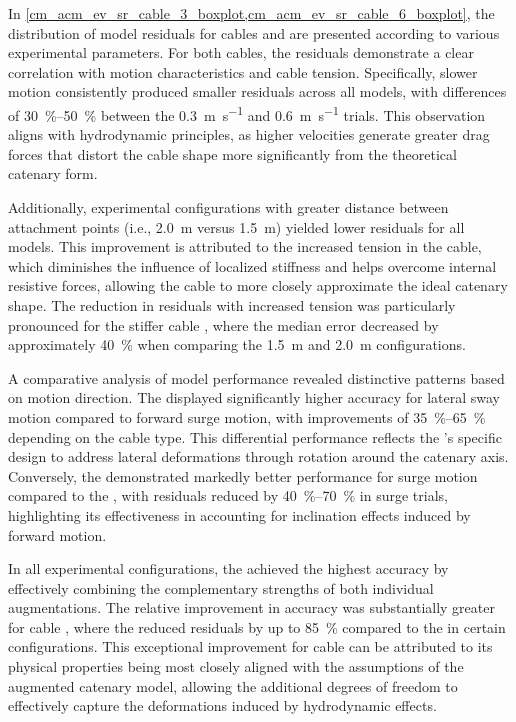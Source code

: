 In \cref{cm_acm_ev_sr_cable_3_boxplot,cm_acm_ev_sr_cable_6_boxplot}, the distribution of model
residuals for cables  and  are presented
according to various experimental parameters. For both cables, the residuals demonstrate a clear
correlation with motion characteristics and cable tension. Specifically, slower motion consistently
produced smaller residuals across all models, with differences of \qtyrange{30}{50}{\percent}
between the \qty{0.3}{\meter\per\second} and \qty{0.6}{\meter\per\second} trials. This observation
aligns with hydrodynamic principles, as higher velocities generate greater drag forces that distort
the cable shape more significantly from the theoretical catenary form.

Additionally, experimental configurations with greater distance between attachment points (i.e.,
\qty{2.0}{\meter} versus \qty{1.5}{\meter}) yielded lower residuals for all models. This
improvement is attributed to the increased tension in the cable, which diminishes the influence of
localized stiffness and helps overcome internal resistive forces, allowing the cable to more
closely approximate the ideal catenary shape. The reduction in residuals with increased tension was
particularly pronounced for the stiffer cable , where the median error
decreased by approximately \qty{40}{\percent} when comparing the \qty{1.5}{\meter} and
\qty{2.0}{\meter} configurations.

A comparative analysis of model performance revealed distinctive patterns based on motion
direction. The \gammamodel{} displayed significantly higher accuracy for lateral sway motion
compared to forward surge motion, with improvements of \qtyrange{35}{65}{\percent} depending on the
cable type. This differential performance reflects the \gammamodel{}'s specific design to address
lateral deformations through rotation around the catenary axis. Conversely, the \thetamodel{}
demonstrated markedly better performance for surge motion compared to the \gammamodel{}, with
residuals reduced by \qtyrange{40}{70}{\percent} in surge trials, highlighting its effectiveness in
accounting for inclination effects induced by forward motion.

In all experimental configurations, the \thetagammamodel{} achieved the highest accuracy by
effectively combining the complementary strengths of both individual augmentations. The relative
improvement in accuracy was substantially greater for cable , where the
\thetagammamodel{} reduced residuals by up to \qty{85}{\percent} compared to the \verticalmodel{}
in certain configurations. This exceptional improvement for cable  can
be attributed to its physical properties being most closely aligned with the assumptions of the
augmented catenary model, allowing the additional degrees of freedom to effectively capture the
deformations induced by hydrodynamic effects.

